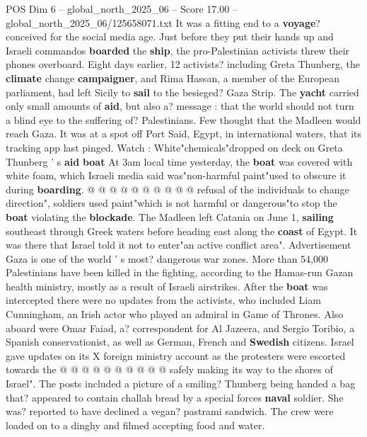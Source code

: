 \begin{textsample}{POS Dim 6 – global\_north\_2025\_06 – Score 17.00 – global\_north\_2025\_06/125658071.txt}  \label{ex:f6_pos_025}
It was a fitting end to a \textbf{voyage}? conceived for the social media age.
Just before they put their hands up and Israeli commandos \textbf{boarded} the \textbf{ship}, the pro-Palestinian activists threw their phones overboard.
Eight days earlier, 12 activists? including Greta Thunberg, the \textbf{climate} change \textbf{campaigner}, and Rima Hassan, a member of the European parliament, had left Sicily to \textbf{sail} to the besieged?
Gaza Strip.
The \textbf{yacht} carried only small amounts of \textbf{aid}, but also a? message : that the world should not turn a blind eye to the suffering of?
Palestinians.
Few thought that the Madleen would reach Gaza.
It was at a spot off Port Said, Egypt, in international waters, that its tracking app last pinged.
Watch : White"chemicals"dropped on deck on Greta Thunberg ' s \textbf{aid} \textbf{boat} At 3am local time yesterday, the \textbf{boat} was covered with white foam, which Israeli media said was"non-harmful paint"used to obscure it during \textbf{boarding}. @ @ @ @ @ @ @ @ @ @ refusal of the individuals to change direction", soldiers used paint"which is not harmful or dangerous"to stop the \textbf{boat} violating the \textbf{blockade}.
The Madleen left Catania on June 1, \textbf{sailing} southeast through Greek waters before heading east along the \textbf{coast} of Egypt.
It was there that Israel told it not to enter"an active conflict area".
Advertisement Gaza is one of the world ' s most? dangerous war zones.
More than 54,000 Palestinians have been killed in the fighting, according to the Hamas-run Gazan health ministry, mostly as a result of Israeli airstrikes.
After the \textbf{boat} was intercepted there were no updates from the activists, who included Liam Cunningham, an Irish actor who played an admiral in Game of Thrones.
Also aboard were Omar Faiad, a? correspondent for Al Jazeera, and Sergio Toribio, a Spanish conservationist, as well as German, French and \textbf{Swedish} citizens.
Israel gave updates on its X foreign ministry account as the protesters were escorted towards the @ @ @ @ @ @ @ @ @ @ safely making its way to the shores of Israel".
The posts included a picture of a smiling?
Thunberg being handed a bag that? appeared to contain challah bread by a special forces \textbf{naval} soldier.
She was? reported to have declined a vegan? pastrami sandwich.
The crew were loaded on to a dinghy and filmed accepting food and water.

\end{textsample}
